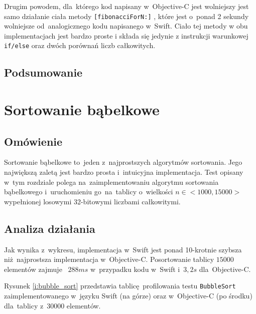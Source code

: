 \documentclass[mgr, shortabstract]{iithesis}
\newcommand{\objcinline}[1]{
    \texttt{#1}
}
\begin{document}
Drugim powodem, dla~którego kod napisany w~Objective-C jest wolniejszy jest samo działanie ciała metody \objcinline{[fibonacciForN:]}, które jest o~ponad 2 sekundy wolniejsze od~analogicznego kodu napisanego w~Swift. Ciało tej metody w obu implementacjach jest bardzo proste i składa się jedynie z instrukcji warunkowej \objcinline{if/else} oraz dwóch porównań liczb całkowitych.

\subsection{Podsumowanie}



\section{Sortowanie bąbelkowe}
\label{s:bubble_sort}

\subsection{Omówienie}

Sortowanie bąbelkowe to~jeden z~najprostszych algorytmów sortowania. Jego największą zaletą jest bardzo prosta i~intuicyjna implementacja. Test opisany w~tym rozdziale polega na~zaimplementowaniu algorytmu sortowania bąbelkowego i~uruchomieniu go~na~tablicy o~wielkości $n \in <1000, 15000>$ wypełnionej losowymi 32-bitowymi liczbami całkowitymi.

\subsection{Analiza działania}

Jak wynika z~wykresu, implementacja w~Swift jest ponad 10-krotnie szybsza niż najprostsza implementacja w~Objective-C. Posortowanie tablicy $15000$ elementów zajmuje ~$288 ms$ w~przypadku kodu w~Swift i~$3,2 s$ dla~Objective-C.

Rysunek \ref{i:bubble_sort} przedstawia tablicę profilowania testu \texttt{BubbleSort} zaimplementowanego w~języku Swift (na górze) oraz w~Objective-C (po środku) dla~tablicy z~30000 elementów.
\end{document}
